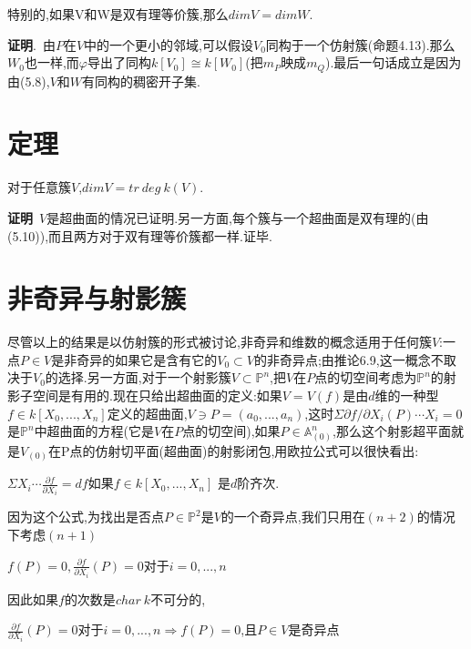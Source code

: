 \documentclass[UTF8]{book}
\begin{document}
特别的,如果V和W是双有理等价簇,那么$ dim V = dim W $.


\textbf{证明}.\ 由$ P $在$ V $中的一个更小的邻域,可以假设$V_{0}$同构于一个仿射簇(命题4.13).那么$W_{0}$也一样,而$\varphi$导出了同构$k[V_{0}]\cong k[W_{0}]$(把$m_{P}$映成$m_{Q}$).最后一句话成立是因为由(5.8),$ V $和$ W $有同构的稠密开子集.


\section{定理}
对于任意簇$ V $,$dim V = tr\ deg\ k(V)$.


\textbf{证明}\ $ V $是超曲面的情况已证明.另一方面,每个簇与一个超曲面是双有理的(由(5.10)),而且两方对于双有理等价簇都一样.证毕.


\section{非奇异与射影簇}
尽管以上的结果是以仿射簇的形式被讨论,非奇异和维数的概念适用于任何簇$ V $:一点$P\in V$是非奇异的如果它是含有它的$V_{0}\subset V$的非奇异点;由推论6.9,这一概念不取决于$V_{0}$的选择.另一方面,对于一个射影簇$V\subset \mathbb{P}^{n}$,把$ V $在$ P $点的切空间考虑为$\mathbb{P}^{n}$的射影子空间是有用的.现在只给出超曲面的定义:如果$ V=V(f) $是由$ d $维的一种型$f\in k[X_{0},...,X_{n}]$定义的超曲面,$V\ni P = (a_{0},...,a_{n})$,这时$\Sigma\partial f/\partial X_{i}(P)\cdots X_{i} = 0$是$\mathbb{P}^{n}$中超曲面的方程(它是$ V $在$ P $点的切空间),如果$P\in \mathbb{A}^{n}_{(0)}$,那么这个射影超平面就是$V_{(0)}$在P点的仿射切平面(超曲面)的射影闭包,用欧拉公式可以很快看出:


\begin{center}
	$\Sigma X_{i}\cdots \frac{\partial f}{\partial X_{i}} = df$如果$f\in k[X_{0},...,X_{n}]$ 是$ d $阶齐次.
\end{center}


因为这个公式,为找出是否点$P\in\mathbb{P}^{2}$是$ V $的一个奇异点,我们只用在$ (n+2) $的情况下考虑$ (n+1) $


\begin{center}
	$f(P) = 0,\frac{\partial f}{\partial X_{i}}(P) = 0$对于$ i = 0,...,n $
\end{center}


因此如果$ f $的次数是$ char\ k $不可分的,


\begin{center}
	$\frac{\partial f}{\partial X_{i}}(P) = 0$对于$ i = 0,...,n $$\Rightarrow f(P) = 0$,且$P\in V$是奇异点
\end{center}
\end{document}
